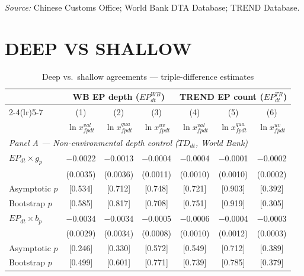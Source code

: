 \documentclass{article}
\begin{document}
\begin{table}[htbp]
\begin{threeparttable}
\begin{tablenotes}[flushleft]
\item \textit{Source:} Chinese Customs Office; World Bank DTA Database; TREND Database.
\end{tablenotes}
\end{threeparttable}
\end{table}

\newpage
\section{DEEP VS SHALLOW}

\begin{table}[htbp]
\centering
\footnotesize
\caption{Deep vs.\ shallow agreements --- triple-difference estimates}
\label{tab:deepshallow}
\begin{threeparttable}
\begin{tabular}{lcccccc}
\toprule
 & \multicolumn{3}{c}{WB EP depth ($EP^{WB}_{dt}$)} & \multicolumn{3}{c}{TREND EP count ($EP^{TR}_{dt}$)} \\
\cmidrule(lr){2-4}\cmidrule(lr){5-7}
 & (1) & (2) & (3) & (4) & (5) & (6) \\
 & $\ln x^{val}_{fpdt}$ & $\ln x^{qua}_{fpdt}$ & $\ln x^{uv}_{fpdt}$ & $\ln x^{val}_{fpdt}$ & $\ln x^{qua}_{fpdt}$ & $\ln x^{uv}_{fpdt}$ \\
\midrule
\multicolumn{7}{l}{\textit{Panel A --- Non-environmental depth control ($TD_{dt}$, World Bank)}} \\[3pt]
$EP_{dt} \times g_p$ & $-$0.0022 & $-$0.0013 & $-$0.0004 & $-$0.0004 & $-$0.0001 & $-$0.0002 \\
 & (0.0035) & (0.0036) & (0.0011) & (0.0010) & (0.0010) & (0.0002) \\[2pt]
\quad Asymptotic $p$ & [0.534] & [0.712] & [0.748] & [0.721] & [0.903] & [0.392] \\
\quad Bootstrap $p$ & [0.585] & [0.817] & [0.708] & [0.751] & [0.919] & [0.305] \\[6pt]
$EP_{dt} \times b_p$ & $-$0.0034 & $-$0.0034 & $-$0.0005 & $-$0.0006 & $-$0.0004 & $-$0.0003 \\
 & (0.0029) & (0.0034) & (0.0008) & (0.0010) & (0.0012) & (0.0003) \\[2pt]
\quad Asymptotic $p$ & [0.246] & [0.330] & [0.572] & [0.549] & [0.712] & [0.389] \\
\quad Bootstrap $p$ & [0.499] & [0.601] & [0.771] & [0.739] & [0.785] & [0.379] \\[6pt]

\end{tabular}
\end{threeparttable}
\end{table}
\end{document}
